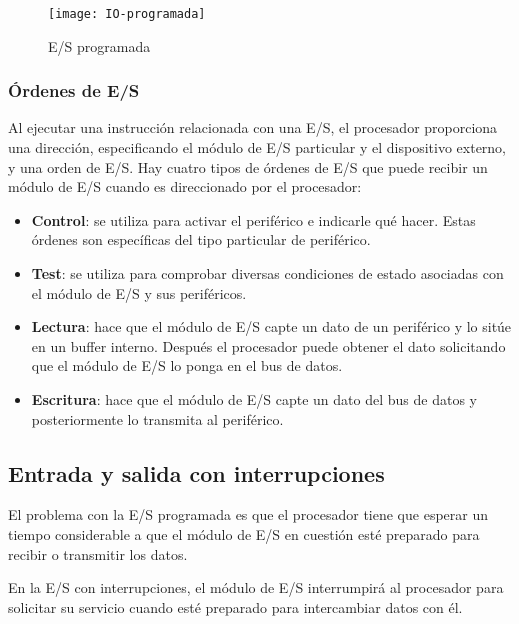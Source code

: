 \begin{figure}[h]
  \centering
  \texttt{[image: IO-programada]}
  \caption{E/S programada}\label{fig:E/S-programada}
\end{figure}

\begin{subs}

  \subsubsection{Órdenes de E/S}
  Al ejecutar una instrucción relacionada con una E/S, el procesador proporciona una dirección, especificando el módulo de E/S particular y el dispositivo externo, y una orden de E/S. Hay cuatro tipos de órdenes de E/S que puede recibir un módulo de E/S cuando es direccionado por el procesador:

  \begin{itemize}
    \item \textbf{Control}: se utiliza para activar el periférico e indicarle qué hacer. Estas órdenes son específicas del tipo particular de periférico.
    \item \textbf{Test}: se utiliza para comprobar diversas condiciones de estado asociadas con el módulo de E/S y sus periféricos.
    \item \textbf{Lectura}: hace que el módulo de E/S capte un dato de un periférico y lo sitúe en un buffer interno. Después el procesador puede obtener el dato solicitando que el módulo de E/S lo ponga en el bus de datos.
    \item \textbf{Escritura}: hace que el módulo de E/S capte un dato del bus de datos y posteriormente lo transmita al periférico.
  \end{itemize}

\end{subs}

\subsection{Entrada y salida con interrupciones}

El problema con la E/S programada es que el procesador tiene que esperar un tiempo considerable a que el módulo de E/S en cuestión esté preparado para recibir o transmitir los datos.

En la E/S con interrupciones, el módulo de E/S interrumpirá al procesador para solicitar su servicio cuando esté preparado para intercambiar datos con él.


